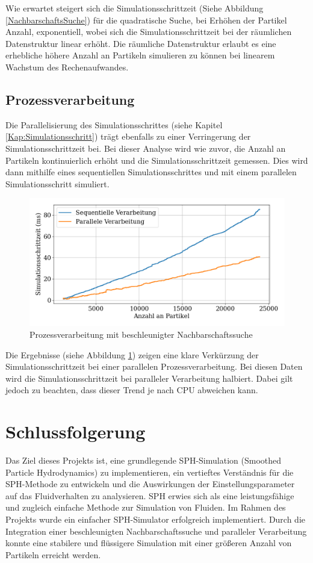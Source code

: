 \documentclass[a4paper, 12pt]{article}
\begin{document}
Wie erwartet steigert sich die Simulationsschrittzeit (Siehe Abbildung  \ref{NachbarschaftsSuche}) für die quadratische Suche, bei Erhöhen der Partikel Anzahl, exponentiell, wobei sich die Simulationsschrittzeit bei der räumlichen Datenstruktur linear erhöht. Die räumliche Datenstruktur erlaubt es eine erhebliche höhere Anzahl an Partikeln simulieren zu können bei linearem Wachstum des Rechenaufwandes.  

\subsection{Prozessverarbeitung}
Die Parallelisierung des Simulationsschrittes (siehe Kapitel \ref{Kap:Simulationsschritt}) trägt ebenfalls zu einer Verringerung der Simulationsschrittzeit bei. Bei dieser Analyse wird wie zuvor, die Anzahl an Partikeln kontinuierlich erhöht und die Simulationsschrittzeit gemessen. Dies wird dann mithilfe eines sequentiellen Simulationsschrittes und mit einem parallelen Simulationsschritt simuliert.

\begin{figure}[H]
	\centering
	\includegraphics[width=.85\textwidth]{graphics/Prozessverarbeitung.png}
	\caption{Prozessverarbeitung mit beschleunigter Nachbarschaftssuche}
	\label{Prozessverarbeitung}
\end{figure}

Die Ergebnisse (siehe Abbildung \ref{Prozessverarbeitung}) zeigen eine klare Verkürzung der Simulationsschrittzeit bei einer parallelen Prozessverarbeitung. Bei diesen Daten wird die Simulationsschrittzeit bei paralleler Verarbeitung halbiert. Dabei gilt jedoch zu beachten, dass dieser Trend je nach CPU abweichen kann.  

\section{Schlussfolgerung}
Das Ziel dieses Projekts ist, eine grundlegende SPH-Simulation (Smoothed Particle Hydrodynamics) zu implementieren, ein vertieftes Verständnis für die SPH-Methode zu entwickeln und die Auswirkungen der Einstellungsparameter auf das Fluidverhalten zu analysieren. SPH erwies sich als eine leistungsfähige und zugleich einfache Methode zur Simulation von Fluiden. Im Rahmen des Projekts wurde ein einfacher SPH-Simulator erfolgreich implementiert. Durch die Integration einer beschleunigten Nachbarschaftssuche und paralleler Verarbeitung konnte eine stabilere und flüssigere Simulation mit einer größeren Anzahl von Partikeln erreicht werden.
\end{document}
